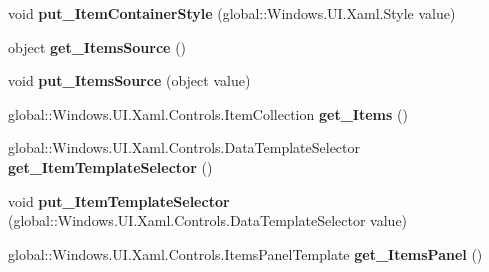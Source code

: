 \begin{DoxyCompactItemize}
\item 
\mbox{\label{interface_windows_1_1_u_i_1_1_xaml_1_1_controls_1_1_i_items_control_ac812f5bc0cf3f55197783982db3f878d}} 
void {\bfseries put\+\_\+\+Item\+Container\+Style} (global\+::\+Windows.\+U\+I.\+Xaml.\+Style value)
\item 
\mbox{\label{interface_windows_1_1_u_i_1_1_xaml_1_1_controls_1_1_i_items_control_a7f2312123673103e92e3794fabb7c45a}} 
object {\bfseries get\+\_\+\+Items\+Source} ()
\item 
\mbox{\label{interface_windows_1_1_u_i_1_1_xaml_1_1_controls_1_1_i_items_control_ac735d213748166057ef4cbaae62e336e}} 
void {\bfseries put\+\_\+\+Items\+Source} (object value)
\item 
\mbox{\label{interface_windows_1_1_u_i_1_1_xaml_1_1_controls_1_1_i_items_control_a747bf3c87ce3337134354f5d9b743404}} 
global\+::\+Windows.\+U\+I.\+Xaml.\+Controls.\+Item\+Collection {\bfseries get\+\_\+\+Items} ()
\item 
\mbox{\label{interface_windows_1_1_u_i_1_1_xaml_1_1_controls_1_1_i_items_control_ab87924da926fb493c4e9f1d66f5e3327}} 
global\+::\+Windows.\+U\+I.\+Xaml.\+Controls.\+Data\+Template\+Selector {\bfseries get\+\_\+\+Item\+Template\+Selector} ()
\item 
\mbox{\label{interface_windows_1_1_u_i_1_1_xaml_1_1_controls_1_1_i_items_control_aa561637adcee5715eed974d70e6d813a}} 
void {\bfseries put\+\_\+\+Item\+Template\+Selector} (global\+::\+Windows.\+U\+I.\+Xaml.\+Controls.\+Data\+Template\+Selector value)
\item 
\mbox{\label{interface_windows_1_1_u_i_1_1_xaml_1_1_controls_1_1_i_items_control_ab7176badfe60bbefeb142105c2d8637a}} 
global\+::\+Windows.\+U\+I.\+Xaml.\+Controls.\+Items\+Panel\+Template {\bfseries get\+\_\+\+Items\+Panel} ()

\end{DoxyCompactItemize}
